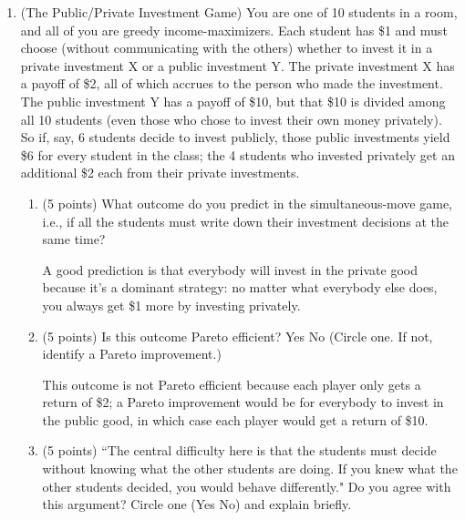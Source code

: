 \documentclass[twoside]{article}
\newcommand{\mybiggerskip}{\vspace{1.5in}}
\begin{document}
\begin{enumerate}
\item (The Public/Private Investment Game) You are one of 10 students in a room, and all of you are greedy income-maximizers. Each student has \$1 and must choose (without communicating with the others) whether to invest it in a private investment X or a public investment Y. The private investment X has a payoff of \$2, all of which accrues to the person who made the investment. The public investment Y has a payoff of \$10, but that \$10 is divided among all 10 students (even those who chose to invest their own money privately). So if, say, 6 students decide to invest publicly, those public investments yield \$6 for every student in the class; the 4 students who invested privately get an additional \$2 each from their private investments.  

    \begin{enumerate}
    \item (5 points) What outcome do you predict in the simultaneous-move game, i.e., if all the students must write down their investment decisions at the same time?
    \begin{EXAM}\mybiggerskip\end{EXAM}
    
\begin{KEY}
A good prediction is that everybody will invest in the private good because it's a dominant strategy: no matter what everybody else does, you always get \$1 more by investing privately. 
\end{KEY}

    \item (5 points) Is this outcome Pareto efficient? Yes  No  (Circle one. 
If not, identify a Pareto improvement.)
    \begin{EXAM}\mybiggerskip\end{EXAM}
    
\begin{KEY}
This outcome is not Pareto efficient because each player only gets a return of \$2; a Pareto improvement would be for everybody to invest in the public good, in which case each player would get a return of \$10. 
\end{KEY}

    \item (5 points) ``The central difficulty here is that the students must decide without knowing what the other students are doing. If you knew what the other students decided, you would behave differently." Do you agree with this argument? Circle one (Yes  No) and explain briefly. 
    \begin{EXAM}\clearpage\end{EXAM}
    

\end{enumerate}
\end{enumerate}
\end{document}
